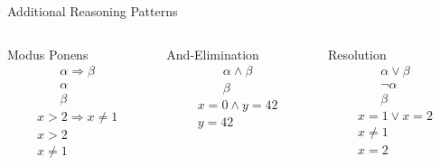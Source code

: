 \documentclass[14pt]{beamer}
\newcommand{\limpl}{\Rightarrow}
\begin{document}
\begin{frame}{Additional Reasoning Patterns}
	\begin{columns}[T]
		\begin{column}{1.4in}
			\begin{block}{Modus Ponens}
				\[
				\begin{array}{l}
					\alpha \limpl \beta \\
					\alpha \\
					\hline
					\beta
				\end{array}
				\]
				\bigskip
				\[
				\begin{array}{l}
					x > 2 \limpl x \neq 1 \\
					x > 2 \\
					\hline
					x \neq 1
				\end{array}
				\]
			\end{block}
		\end{column}
		\pause
		\begin{column}{1.4in}
			\begin{block}{And-Elimination}
				\vspace{1.2em}
				\[
				\begin{array}{l}
					\alpha \land \beta \\
					\hline
					\beta
				\end{array}
				\]
				\bigskip
				\vspace{1.2em}
				\[
				\begin{array}{l}
					x = 0 \land y = 42 \\
					\hline
					y = 42
				\end{array}
				\]
			\end{block}
		\end{column}
		\pause
		\begin{column}{1.4in}
			\begin{block}{Resolution}
				\[
				\begin{array}{l}
					\alpha \lor \beta \\
					\lnot\alpha \\
					\hline
					\beta
				\end{array}
				\]
				\bigskip
				\[
				\begin{array}{l}
					x = 1 \lor x = 2 \\
					x \neq 1 \\
					\hline
					x = 2
				\end{array}
				\]
			\end{block}
		\end{column}
	\end{columns}
\end{frame}
\end{document}
